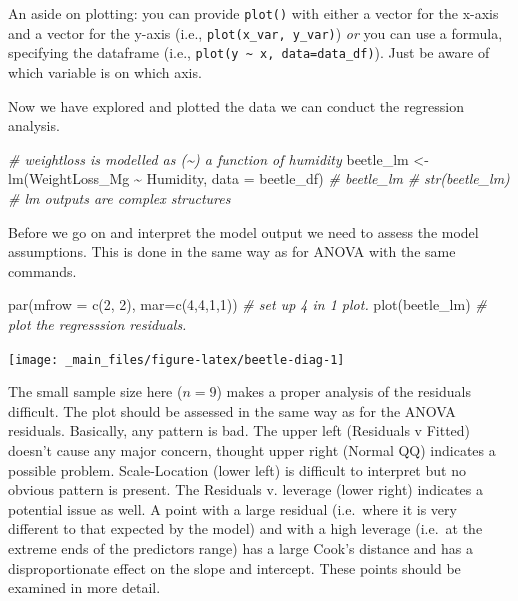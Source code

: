 \documentclass[
  11pt,
  a4paper,
]{book}
\newenvironment{Shaded}{\begin{snugshade}}{\end{snugshade}}
\newcommand{\AttributeTok}[1]{\textcolor[rgb]{0.77,0.63,0.00}{#1}}
\newcommand{\CommentTok}[1]{\textcolor[rgb]{0.56,0.35,0.01}{\textit{#1}}}
\newcommand{\DecValTok}[1]{\textcolor[rgb]{0.00,0.00,0.81}{#1}}
\newcommand{\FunctionTok}[1]{\textcolor[rgb]{0.00,0.00,0.00}{#1}}
\newcommand{\NormalTok}[1]{#1}
\newcommand{\OtherTok}[1]{\textcolor[rgb]{0.56,0.35,0.01}{#1}}
\newcommand{\SpecialCharTok}[1]{\textcolor[rgb]{0.00,0.00,0.00}{#1}}
\begin{document}
An aside on plotting: you can provide \texttt{plot()} with either a vector for the x-axis and a vector for the y-axis (i.e., \texttt{plot(x\_var,\ y\_var)}) \emph{or} you can use a formula, specifying the dataframe (i.e., \texttt{plot(y\ \textasciitilde{}\ x,\ data=data\_df)}). Just be aware of which variable is on which axis.

Now we have explored and plotted the data we can conduct the regression analysis.

\begin{Shaded}
\begin{Highlighting}[]
\CommentTok{\# weightloss is modelled as (\textasciitilde{}) a function of humidity}
\NormalTok{beetle\_lm }\OtherTok{\textless{}{-}} \FunctionTok{lm}\NormalTok{(WeightLoss\_Mg }\SpecialCharTok{\textasciitilde{}}\NormalTok{ Humidity, }\AttributeTok{data =}\NormalTok{ beetle\_df) }
\CommentTok{\# beetle\_lm}
\CommentTok{\# str(beetle\_lm) \# lm outputs are complex structures}
\end{Highlighting}
\end{Shaded}

Before we go on and interpret the model output we need to assess the model assumptions. This is done in the same way as for ANOVA with the same commands.

\begin{Shaded}
\begin{Highlighting}[]
\FunctionTok{par}\NormalTok{(}\AttributeTok{mfrow =} \FunctionTok{c}\NormalTok{(}\DecValTok{2}\NormalTok{, }\DecValTok{2}\NormalTok{), }\AttributeTok{mar=}\FunctionTok{c}\NormalTok{(}\DecValTok{4}\NormalTok{,}\DecValTok{4}\NormalTok{,}\DecValTok{1}\NormalTok{,}\DecValTok{1}\NormalTok{)) }\CommentTok{\# set up 4 in 1 plot.}
\FunctionTok{plot}\NormalTok{(beetle\_lm) }\CommentTok{\# plot the regresssion residuals.}
\end{Highlighting}
\end{Shaded}

\begin{center}\texttt{[image: \_main\_files/figure-latex/beetle-diag-1]} \end{center}

The small sample size here (\(n=9\)) makes a proper analysis of the residuals difficult. The plot should be assessed in the same way as for the ANOVA residuals. Basically, any pattern is bad. The upper left (Residuals v Fitted) doesn't cause any major concern, thought upper right (Normal QQ) indicates a possible problem. Scale-Location (lower left) is difficult to interpret but no obvious pattern is present. The Residuals v. leverage (lower right) indicates a potential issue as well. A point with a large residual (i.e.~where it is very different to that expected by the model) and with a high leverage (i.e.~at the extreme ends of the predictors range) has a large Cook's distance and has a disproportionate effect on the slope and intercept. These points should be examined in more detail.
\end{document}
